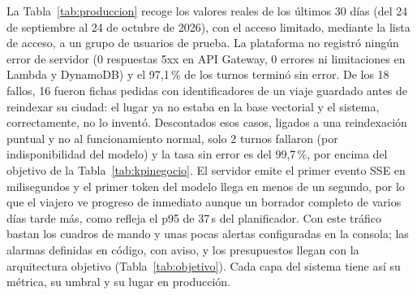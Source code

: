 La Tabla~\ref{tab:produccion} recoge los valores reales de los últimos 30 días (del 24 de
septiembre al 24 de octubre de 2026), con el acceso limitado, mediante la lista de acceso, a un
grupo de usuarios de prueba. La plataforma no registró ningún error de servidor (0 respuestas 5xx
en API Gateway, 0 errores ni limitaciones en Lambda y DynamoDB) y el 97,1\,\% de los turnos terminó
sin error. De los 18 fallos, 16 fueron fichas pedidas con identificadores de un viaje guardado
antes de reindexar su ciudad: el lugar ya no estaba en la base vectorial y el sistema,
correctamente, no lo inventó. Descontados esos casos, ligados a una reindexación puntual y no al
funcionamiento normal, solo 2 turnos fallaron (por indisponibilidad del modelo) y la tasa
sin error es del 99,7\,\%, por encima del objetivo de la Tabla~\ref{tab:kpinegocio}. El servidor
emite el primer evento SSE en milisegundos y el primer token del modelo llega en menos de un
segundo, por lo que el viajero ve progreso de inmediato aunque un borrador completo de varios días
tarde más, como refleja el p95 de 37\,s del planificador. Con este tráfico bastan los cuadros de
mando y unas pocas alertas configuradas en la consola; las alarmas definidas en código, con aviso,
y los presupuestos llegan con la arquitectura objetivo
(Tabla~\ref{tab:objetivo}). Cada capa del sistema tiene así su métrica, su umbral y su lugar en
producción.

